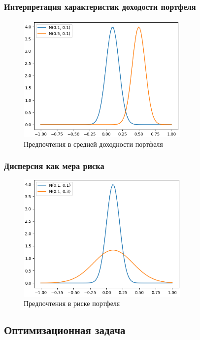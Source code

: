 \documentclass{beamer}
\begin{document}
\begin{frame}
    \frametitle{Интерпретация характеристик доходости портфеля}
    \begin{figure}
        \centering
        \includegraphics[width=0.75\textwidth]{equal_var_cut.png}
        \caption{Предпочтения в средней доходности портфеля}
        \label{fig:equal_var}
    \end{figure}
\end{frame}

\begin{frame}
    \frametitle{Дисперсия как мера риска}
    \begin{figure}
        \centering
        \includegraphics[width=0.75\textwidth]{equal_mean_cut.png}
        \caption{Предпочтения в риске портфеля}
        \label{fig:equal_mean}
    \end{figure}
\end{frame}

\subsection{Оптимизационная задача}
\end{document}
